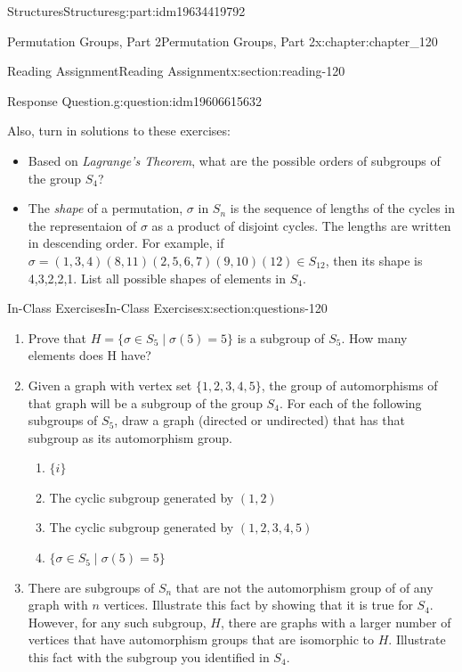 \documentclass[oneside,10pt,]{book}
\numberwithin{equation}{section}
\begin{document}
\begin{partptx}{Structures}{}{Structures}{}{}{g:part:idm19634419792}
\begin{chapterptx}{Permutation Groups, Part 2}{}{Permutation Groups, Part 2}{}{}{x:chapter:chapter_120}
\begin{sectionptx}{Reading Assignment}{}{Reading Assignment}{}{}{x:section:reading-120}
\begin{question}{Response Question.}{g:question:idm19606615632}
\end{question}
Also, turn in solutions to these exercises:%
\begin{itemize}[label=\textbullet]
\item{}Based on \emph{Lagrange's Theorem}, what are the possible orders of subgroups of the group \(S_4\)?%
\item{}The \emph{shape} of a permutation, \(\sigma\) in \(S_n\) is the sequence of lengths of the cycles in the representaion of \(\sigma\) as a product of disjoint cycles. The lengths are written in descending order.  For example, if \(\sigma = (1,3,4)(8,11)(2,5,6,7)(9,10)(12) \in S_{12}\), then its shape is  4,3,2,2,1.  List all possible shapes of elements in \(S_4\).%
\end{itemize}
%
\end{sectionptx}
%
%
\typeout{************************************************}
\typeout{************************************************}
%
\begin{sectionptx}{In-Class Exercises}{}{In-Class Exercises}{}{}{x:section:questions-120}
%
\begin{enumerate}[label=\arabic*.]
\item{}Prove that \(H =\{\sigma \in S_5 \mid \sigma(5)=5 \}\) is a subgroup of \(S_5\).  How many elements does H have?%
\item{}Given a graph with vertex set \(\{1, 2, 3, 4, 5\}\), the group of automorphisms of that graph will be a subgroup of the group  \(S_4\). For each of the following subgroups of \(S_5\), draw a graph (directed or undirected) that has that subgroup as its automorphism group.%
\begin{enumerate}[label=(\alph*)]
\item{}\(\displaystyle \{i\}\)%
\item{}The cyclic subgroup generated by \((1,2)\)%
\item{}The cyclic subgroup generated by \((1,2,3,4,5)\)%
\item{}\(\displaystyle \{\sigma \in S_5 \mid \sigma(5)=5  \}\)%
\end{enumerate}
%
\item{}There are subgroups of \(S_n\) that are not the automorphism group of of any graph with \(n\) vertices.  Illustrate this fact by showing that it is true for \(S_4\).  However, for any such subgroup, \(H\), there are graphs with a larger number of vertices that have automorphism groups that are isomorphic to \(H\). Illustrate this fact with the subgroup you identified in \(S_4\).%

\end{enumerate}
\end{sectionptx}
\end{chapterptx}
\end{partptx}
\end{document}
